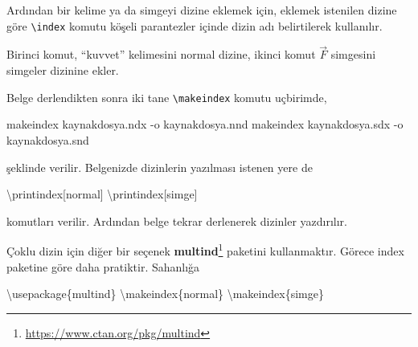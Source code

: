 \documentclass[
  10pt,
]{scrbook}
\newenvironment{Shaded}{\begin{snugshade}}{\end{snugshade}}
\newcommand{\AttributeTok}[1]{\textcolor[rgb]{0.77,0.63,0.00}{#1}}
\newcommand{\BuiltInTok}[1]{#1}
\newcommand{\ExtensionTok}[1]{#1}
\newcommand{\FunctionTok}[1]{\textcolor[rgb]{0.00,0.00,0.00}{#1}}
\newcommand{\NormalTok}[1]{#1}
\newcommand{\SpecialCharTok}[1]{\textcolor[rgb]{0.00,0.00,0.00}{#1}}
\newcommand{\SpecialStringTok}[1]{\textcolor[rgb]{0.31,0.60,0.02}{#1}}
\renewcommand{\href}[2]{#2\footnote{\url{#1}}}
\theoremstyle{definition}
\theoremstyle{definition}
\theoremstyle{definition}
\theoremstyle{definition}
\theoremstyle{remark}
\begin{document}
Ardından bir kelime ya da simgeyi dizine eklemek için, eklemek istenilen dizine göre \texttt{\textbackslash{}index} komutu köşeli parantezler içinde dizin adı belirtilerek kullanılır.

\begin{Shaded}
\end{Shaded}

Birinci komut, ``kuvvet'' kelimesini normal dizine, ikinci komut \(\vec{F}\) simgesini simgeler dizinine ekler.

Belge derlendikten sonra iki tane \texttt{\textbackslash{}makeindex} komutu uçbirimde,

\begin{Shaded}
\begin{Highlighting}[]
\ExtensionTok{makeindex}\NormalTok{ kaynakdosya.ndx }\AttributeTok{{-}o}\NormalTok{ kaynakdosya.nnd }
\ExtensionTok{makeindex}\NormalTok{ kaynakdosya.sdx }\AttributeTok{{-}o}\NormalTok{ kaynakdosya.snd }
\end{Highlighting}
\end{Shaded}

şeklinde verilir. Belgenizde dizinlerin yazılması istenen yere de

\begin{Shaded}
\begin{Highlighting}[]
\FunctionTok{\textbackslash{}printindex}\NormalTok{[normal]}
\FunctionTok{\textbackslash{}printindex}\NormalTok{[simge]}
\end{Highlighting}
\end{Shaded}

komutları verilir. Ardından belge tekrar derlenerek dizinler yazdırılır.

Çoklu dizin için diğer bir seçenek \href{https://www.ctan.org/pkg/multind}{\textbf{multind}} paketini kullanmaktır. Görece index paketine göre daha pratiktir. Sahanlığa

\begin{Shaded}
\begin{Highlighting}[]
\BuiltInTok{\textbackslash{}usepackage}\NormalTok{\{}\ExtensionTok{multind}\NormalTok{\}}
\FunctionTok{\textbackslash{}makeindex}\NormalTok{\{normal\}}
\FunctionTok{\textbackslash{}makeindex}\NormalTok{\{simge\}}
\end{Highlighting}
\end{Shaded}
\end{document}
